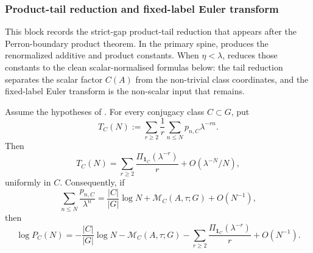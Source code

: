\subsubsection{Product-tail reduction and fixed-label Euler transform}
\label{subsubsec:class-product-tail-reduction}

This block records the strict-gap product-tail reduction that appears after the
Perron-boundary product theorem.  In the primary spine,
 produces the renormalized
additive and product constants.  When
\(\eta<\lambda\),  reduces those constants
to the clean scalar-normalised formulas below: the tail reduction separates the
scalar factor \(C(A)\) from the non-trivial class coordinates, and the
fixed-label Euler transform is the non-scalar input that remains.

\begin{lemma}
  \label{lem:class-euler-product-tail-bound}
  Assume the hypotheses of .  For every
  conjugacy class \(C\subset G\), put
  \[
    T_C(N):=
      \sum_{r\ge2}\frac1r\sum_{n\le N}p_{n,C}\lambda^{-rn}.
  \]
  Then
  \begin{equation}\label{eq:class-product-tail-bound}
    T_C(N)=
      \sum_{r\ge2}\frac{\Pi_{\mathbf1_C}(\lambda^{-r})}{r}
      +O(\lambda^{-N}/N),
  \end{equation}
  uniformly in \(C\). Consequently, if
  \begin{equation}\label{eq:class-product-log-bound-input}
    \sum_{n\le N}\frac{p_{n,C}}{\lambda^n}
    =
    \frac{|C|}{|G|}\log N+\mathcal M_C(A,\tau;G)+O(N^{-1}),
  \end{equation}
  then
  \begin{equation}\label{eq:class-product-log-bound-output}
    \log P_C(N)=
    -\frac{|C|}{|G|}\log N
    -\mathcal M_C(A,\tau;G)
    -\sum_{r\ge2}\frac{\Pi_{\mathbf1_C}(\lambda^{-r})}{r}
    +O(N^{-1}).
  \end{equation}
\end{lemma}

